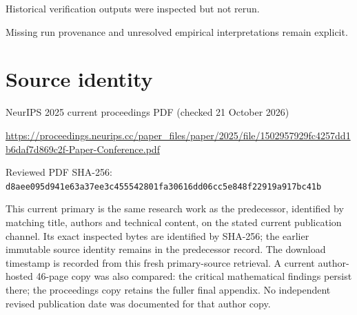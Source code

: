 \documentclass[11pt]{article}
\begin{document}
Historical verification outputs were inspected but not rerun.\par

Missing run provenance and unresolved empirical interpretations remain explicit.\par

\section*{Source identity}

NeurIPS 2025 current proceedings PDF (checked 21 October 2026)

\url{https://proceedings.neurips.cc/paper_files/paper/2025/file/1502957929fc4257dd1b6daf7d869c2f-Paper-Conference.pdf}

Reviewed PDF SHA-256: \nolinkurl{d8aee095d941e63a37ee3c455542801fa30616dd06cc5e848f22919a917bc41b}

This current primary is the same research work as the predecessor, identified by matching title, authors and technical content, on the stated current publication channel. Its exact inspected bytes are identified by SHA-256; the earlier immutable source identity remains in the predecessor record. The download timestamp is recorded from this fresh primary-source retrieval. A current author-hosted 46-page copy was also compared: the critical mathematical findings persist there; the proceedings copy retains the fuller final appendix. No independent revised publication date was documented for that author copy.
\end{document}
